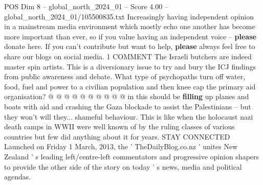 \begin{textsample}{POS Dim 8 – global\_north\_2024\_01 – Score 4.00 – global\_north\_2024\_01/105500835.txt}
Increasingly having independent opinion in a mainstream media environment which mostly echo one another has become more important than ever, so if you value having an independent voice -- \textbf{please} donate here.
If you can't contribute but want to help, \textbf{please} always feel free to share our blogs on social media. 1 COMMENT The Israeli butchers are indeed master spin artists.
This is a diversionary issue to try and bury the ICJ findings from public awareness and debate.
What type of psychopaths turn off water, food, fuel and power to a civilian population and then knee cap the primary aid organisation? @ @ @ @ @ @ @ @ @ @ in this should be \textbf{filling} up planes and boats with aid and crashing the Gaza blockade to assist the Palestinians -- but they won't will they... shameful behaviour.
This is like when the holocaust nazi death camps in WWII were well known of by the ruling classes of various countries but few did anything about it for years.
STAY CONNECTED Launched on Friday 1 March, 2013, the ' TheDailyBlog.co.nz ' unites New Zealand ' s leading left/centre-left commentators and progressive opinion shapers to provide the other side of the story on today ' s news, media and political agendas.

\end{textsample}
